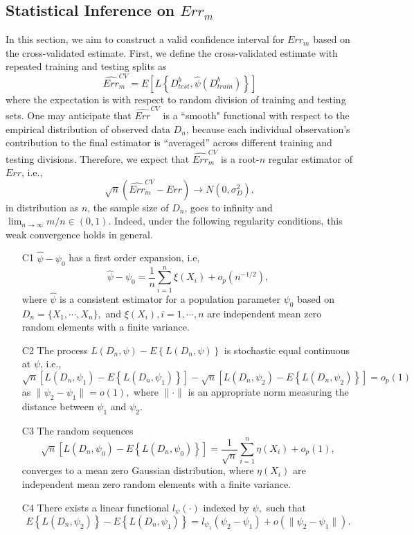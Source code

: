 \documentclass[12pt]{article}
\begin{document}
\subsection{Statistical Inference on $Err_m$}
In this section, we aim to construct a valid confidence interval for $Err_m$ based on the cross-validated estimate.  First, we define the cross-validated estimate with repeated training and testing splits as 
$$ \widehat{Err}^{CV}_m = E\left[L\left\{D_{test}^b, \hat{\psi}(D_{train}^b)\right\}\right]$$
where the expectation is with respect to random division of training and testing sets. One may anticipate that $\widehat{Err}^{CV}$ is a ``smooth" functional with respect to the empirical distribution of observed data $D_n$, because each individual observation's contribution to the final estimator is ``averaged'' across different training and testing divisions.  Therefore, we expect that $\widehat{Err}^{CV}_m$ is a root-$n$ regular estimator of $Err$, i.e.,
$$\sqrt{n}\left(\widehat{Err}^{CV}_m-Err\right) \rightarrow N(0, \sigma_D^2),$$
in distribution as $n$, the sample size of $D_n$, goes to infinity and $\lim_{n\rightarrow \infty} m/n \in (0, 1).$  Indeed, under the following regularity conditions, this weak convergence holds in general.
\begin{enumerate}
\item[C1] $\hat{\psi}-\psi_0$ has a first order expansion, i.e, 
$$\hat{\psi}-\psi_0=\frac{1}{n}\sum_{i=1}^n \xi(X_i)+o_p(n^{-1/2}),$$
where $\hat{\psi}$ is a consistent estimator for a population parameter $\psi_0$ based on $D_n=\{X_1,\cdots, X_n\},$ and $\xi(X_i),i=1,\cdots, n$ are independent mean zero random elements with a finite variance.
\item[C2] The process $L\left(D_n, \psi\right)-E\left\{L(D_n, \psi)\right\}$ is stochastic equal continuous at $\psi$, i.e., 
$$ \sqrt{n}\left[L\left(D_n, \psi_1\right)-E\left\{L(D_n, \psi_1)\right\}\right]-\sqrt{n}\left[ L\left(D_n, \psi_2\right)-E\left\{L(D_n, \psi_2)\right\}\right]=o_p(1)$$
as $\|\psi_2-\psi_1\|=o(1),$ where $\|\cdot\|$ is an appropriate norm measuring the distance between $\psi_1$ and $\psi_2.$ \cite{kosorok2008introduction}
\item[C3] The random sequences 
$$\sqrt{n}\left[L\left(D_n, \psi_0\right)-E\left\{L(D_n, \psi_0)\right\}\right]
=\frac{1}{\sqrt{n}}\sum_{i=1}^n \eta(X_i)+o_p(1),$$ converges to a mean zero Gaussian distribution, where $\eta(X_i)$ are independent mean zero random elements with a finite variance.
\item[C4] There exists a linear functional $l_{\psi}(\cdot)$ indexed by $\psi,$ such that
$$E\left\{L(D_n, \psi_2)\right\}-E\left\{L(D_n, \psi_1)\right\}=l_{\psi_1}(\psi_2-\psi_1)+o(\|\psi_2-\psi_1\|).$$ 
\end{enumerate}
\end{document}
